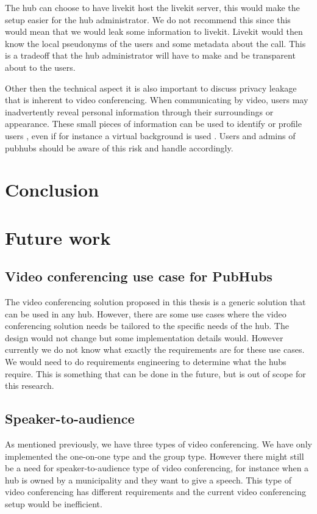 \documentclass{report}
\begin{document}
The hub can choose to have livekit host the livekit server, this would make the setup easier for the hub administrator.
We do not recommend this since this would mean that we would leak some information to livekit. Livekit would then know
the local pseudonyms of the users and some metadata about the call. This is a tradeoff that the hub administrator will
have to make and be transparent about to the users.

Other then the technical aspect it is also important to discuss privacy leakage that is inherent to video conferencing.
When communicating by video, users may inadvertently reveal personal information through their surroundings or
appearance. These small pieces of information can be used to identify or profile users \cite{Kagan_Alpert_Fire_2024},
even if for instance a virtual background is used \cite{Hilgefort_Arp_Rieck_2021}. Users and admins of pubhubs should be aware of
this risk and handle accordingly.

\chapter{Conclusion}


\chapter{Future work}
\section{Video conferencing use case for PubHubs}
The video conferencing solution proposed in this thesis is a generic solution that can be used in any hub. However,
there are some use cases where the video conferencing solution needs be tailored to the specific needs of the hub.
The design would not change but some implementation details would. However currently we do not know what exactly the
requirements are for these use cases. We would need to do requirements engineering to determine what the hubs require.
This is something that can be done in the future, but is out of scope for this research.

\section{Speaker-to-audience}
As mentioned previously, we have three types of video conferencing. We have only implemented the one-on-one type and
the group type. However there might still be a need for speaker-to-audience type of video conferencing, for instance
when a hub is owned by a municipality and they want to give a speech. This type of video conferencing has different
requirements and the current video conferencing setup would be inefficient.
\end{document}
